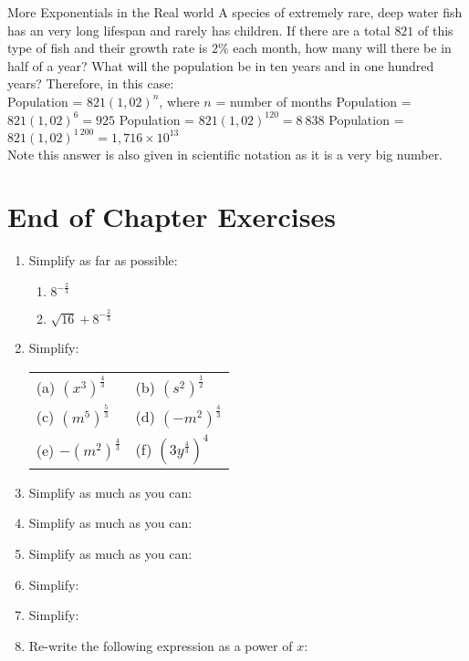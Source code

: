 \begin{wex}{More Exponentials in the Real world} 
{A species of extremely rare, deep water fish has an very long lifespan and rarely has children. If there are a total $821$ of this type of fish and their growth rate is $2\%$ each month, how many will there be in half of a year? What will the population be in ten years and in one hundred years?}{
Therefore, in this case:\\
Population = $821(1,02)^n$,   where $n$ = number of months
Population = $821(1,02)^6 = 925$
Population = $821(1,02)^{120} = 8~838$
Population = $821(1,02)^{1~200} = 1,716 \times 10^{13}$\\
Note this answer is also given in scientific notation as it is a very big number.}
\end{wex}

\section{End of Chapter Exercises}
\begin{enumerate}
\item{Simplify as far as possible:
\begin{enumerate}
\item{$8^{-\frac{2}{3}}$}
\item{$\sqrt{16}+8^{-\frac{2}{3}}$}
\end{enumerate}}
\item{Simplify:
\begin{center}
\begin{tabular}{p{4cm}p{4cm}}
(a) $(x^3)^\frac{4}{3}$ & (b) $(s^2)^\frac{1}{2}$\\
(c) $(m^5)^\frac{5}{3}$& (d) $(-m^2)^\frac{4}{3}$\\
(e) $-(m^2)^\frac{4}{3}$&(f) $(3y^\frac{4}{3})^4$\\
\end{tabular}
\end{center}}

\item{Simplify as much as you can:
}

\item{Simplify as much as you can:
}

\item{Simplify as much as you can:
}
 \item{Simplify:
}

\item{Simplify:
}

\item{Re-write the following expression as a power of $x$:
}

\end{enumerate}







